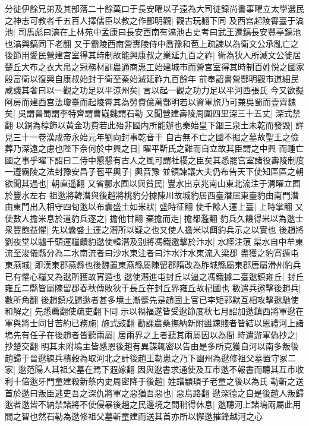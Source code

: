 分徙伊餘兄弟及其部落二十餘萬口于長安曜以子遠為大司徒録尚書事曜立太學選民之神志可教者千五百人擇儒臣以教之作酆明觀|{
	觀古玩翻下同}
及西宫起陵霄臺于滈池|{
	司馬彪曰滈在上林苑中孟康曰長安西南有滈池古史考曰武王遷鎬長安豐亭鎬池也滈與鎬同下老翻}
又于霸陵西南營夀陵侍中喬豫和苞上疏諫以為衛文公承亂亡之後節用愛民營建宫室得其時制故能興康叔之業延九百之祚|{
	衛為狄人所滅文公徙居楚丘大布之衣大帛之冠務材訓農通商惠工始建城市而營宮室得其時制百姓悦之國家殷富衛以復興自康叔始封于衛至秦始滅延祚九百餘年}
前奉詔書營酆明觀市道細民咸譏其奢曰以一觀之功足以平涼州矣|{
	言以起一觀之功力足以平河西張氏}
今又欲擬阿房而建西宫法瓊臺而起陵霄其為勞費億萬酆明若以資軍旅乃可兼吳蜀而壹齊魏矣|{
	吳謂晉蜀謂李特齊謂曹嶷魏謂石勒}
又聞營建壽陵周圍四里深三十五丈|{
	深式禁翻}
以銅為椁飾以黄金功費若此殆非國内所能辦也秦始皇下錮三泉土未乾而發毁|{
	詳見三十一卷漢成帝永始元年劉向封事乾音干}
自古無不亡之國不掘之墓故聖王之儉葬乃深遠之慮也陛下奈何於中興之日|{
	曜平靳氏之難而自立故其臣謂之中興}
而踵亡國之事乎曜下詔曰二侍中懇懇有古人之風可謂社稷之臣矣其悉罷宫室諸役夀陵制度一遵霸陵之法封豫安昌子苞平輿子|{
	輿音豫}
並領諫議大夫仍布告天下使知區區之朝欲聞其過也|{
	朝直遥翻}
又省酆水囿以與貧民|{
	豐水出京兆南山東北流注于渭曜立囿於豐水左右}
祖逖將韓潛與後趙將桃豹分據陳川故城豹居西臺潛居東臺豹由南門潛由東門出入相守四旬逖以布囊盛土如米狀|{
	盛時征翻}
使千餘人運上臺|{
	上時掌翻}
又使數人擔米息於道豹兵逐之|{
	擔他甘翻}
棄擔而走|{
	擔都濫翻}
豹兵久饑得米以為逖士衆豐飽益懼|{
	先以囊盛土運之潛所以疑之也又使人擔米以餌豹兵示之以實也}
後趙將劉夜堂以驢千頭運糧饋豹逖使韓潛及别將馮鐵邀擊於汴水|{
	水經注蒗渠水自中牟東流至浚儀縣分為二水南流者曰沙水東注者曰汴水汴水東流入梁郡}
盡獲之豹宵遁屯東燕城|{
	即漢東郡燕縣也後魏置東燕縣屬陳留郡隋改為胙城縣屬東郡唐屬滑州豹兵已有懼心糧又為逖所獲故宵遁也}
逖使潛進屯封丘以逼之馮鐵據二臺逖鎮雍丘|{
	封丘雍丘二縣皆屬陳留郡春秋傳敗狄于長丘在封丘界雍丘故杞國也}
數遣兵邀擊後趙兵|{
	數所角翻}
後趙鎮戌歸逖者甚多境土漸蹙先是趙固上官已李矩郭默互相攻擊逖馳使和解之|{
	先悉薦翻使疏吏翻下同}
示以禍福遂皆受逖節度秋七月詔加逖鎮西將軍逖在軍與將士同甘苦約已務施|{
	施式豉翻}
勸課農桑撫納新附雖踈賤者皆結以恩禮河上諸塢先有任子在後趙者皆聽兩屬|{
	居兩界之上者聽其兩屬因以為間}
時遣游軍偽抄之|{
	抄楚交翻}
明其未附塢主皆感恩後趙有異謀輒密以告由是多所克獲自河以南多叛後趙歸于晉逖練兵積穀為取河北之計後趙王勒患之乃下幽州為逖修祖父墓置守冢二家|{
	逖范陽人其祖父墓在焉下遐嫁翻}
因與逖書求通使及互市逖不報書而聽其互市收利十倍逖牙門童建殺新蔡内史周密降于後趙|{
	姓譜顓頊子老童之後以為氏}
勒斬之送首於逖曰叛臣逃吏吾之深仇將軍之惡猶吾惡也|{
	惡烏路翻}
逖深德之自是後趙人叛歸逖者逖皆不納禁諸將不使侵暴後趙之民邊境之間稍得休息|{
	逖聽河上諸塢兩屬此用間之智也然石勒為逖修祖父墓斬童建而送其首亦所以懈逖摧鋒越河之心}
